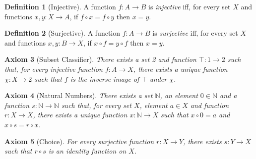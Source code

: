 \documentclass{book}
\newtheorem{ax}{Axiom}[chapter]
\theoremstyle{definition}
\newtheorem{df}[ax]{Definition}
\begin{document}
\begin{df}[Injective]
A function $f : A \rightarrow B$ is \emph{injective} iff, for every set $X$ and functions $x,y : X \rightarrow A$, if $f \circ x = f \circ y$ then $x = y$.
\end{df}

\begin{df}[Surjective]
A function $f : A \rightarrow B$ is \emph{surjective} iff, for every set $X$ and functions $x,y : B \rightarrow X$, if $x \circ f = y \circ f$ then $x = y$.
\end{df}

\begin{ax}[Subset Classifier]
There exists a set 2 and function $\top : 1 \rightarrow 2$ such that, for every injective function $f : A \rightarrow X$, there exists a unique function $\chi : X \rightarrow 2$ such that $f$ is the inverse image of $\top$ under $\chi$.
\end{ax}

\begin{ax}[Natural Numbers]
There exists a set $\mathbb{N}$, an element $0 \in \mathbb{N}$ and a function $s : \mathbb{N} \rightarrow \mathbb{N}$ such that, for every set $X$, element $a \in X$ and function $r : X \rightarrow X$, there exists a unique function $x : \mathbb{N} \rightarrow X$ such that $x \circ 0 = a$ and $x \circ s = r \circ x$.
\end{ax}

\begin{ax}[Choice]
For every surjective function $r : X \rightarrow Y$, there exists $s : Y \rightarrow X$ such that $r \circ s$ is an identity function on $X$.
\end{ax}
\end{document}
